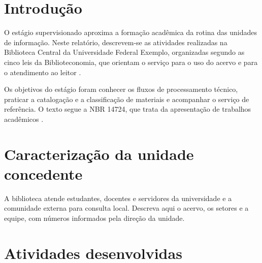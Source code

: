 \documentclass[12pt,a4paper]{report}
\newif\ifinstrucoes
\newcommand{\instrucao}[1]{\ifinstrucoes{\color{gray}\small\itshape #1\par}\fi}
\newcommand{\concedente}{Biblioteca Central da Universidade Federal Exemplo}
\begin{document}
\section{Introdução}
\instrucao{Em dois ou três parágrafos: o que é o estágio, por que ele faz parte da formação e quais objetivos você levou para a unidade. Exemplo: aplicar a catalogação descritiva e conhecer a rotina do atendimento ao usuário.}

O estágio supervisionado aproxima a formação acadêmica da rotina das unidades de informação. Neste relatório, descrevem-se as atividades realizadas na \concedente{}, organizadas segundo as cinco leis da Biblioteconomia, que orientam o serviço para o uso do acervo e para o atendimento ao leitor \cite{ranganathan2009}.

Os objetivos do estágio foram conhecer os fluxos de processamento técnico, praticar a catalogação e a classificação de materiais e acompanhar o serviço de referência. O texto segue a NBR 14724, que trata da apresentação de trabalhos acadêmicos \cite{nbr14724}.

\section{Caracterização da unidade concedente}
\instrucao{Descreva a biblioteca em meia página: vínculo institucional, público atendido, tamanho do acervo, equipe, serviços oferecidos e sistema de gestão usado. Use dados fornecidos pela própria unidade.}

A biblioteca atende estudantes, docentes e servidores da universidade e a comunidade externa para consulta local. Descreva aqui o acervo, os setores e a equipe, com números informados pela direção da unidade.

\section{Atividades desenvolvidas}
\instrucao{Liste as atividades por setor e mostre no cronograma em que semanas cada uma ocorreu. Depois comente as mais importantes, com exemplos do que você fez.}
\end{document}
